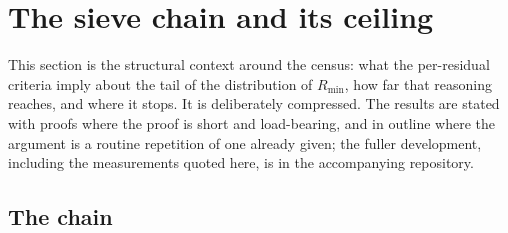 \documentclass[11pt]{article}
\theoremstyle{plain}
\theoremstyle{remark}
\theoremstyle{plain}
\numberwithin{equation}{section}
\begin{document}
\section{The sieve chain and its ceiling}\label{sec:context}

This section is the structural context around the census: what the
per-residual criteria imply about the tail of the distribution of
$R_{\min}$, how far that reasoning reaches, and where it stops. It is
deliberately compressed. The results are stated with proofs where the
proof is short and load-bearing, and in outline where the argument is
a routine repetition of one already given; the fuller development,
including the measurements quoted here, is in the accompanying
repository.

\subsection{The chain}\label{sec:sieve}
\end{document}
